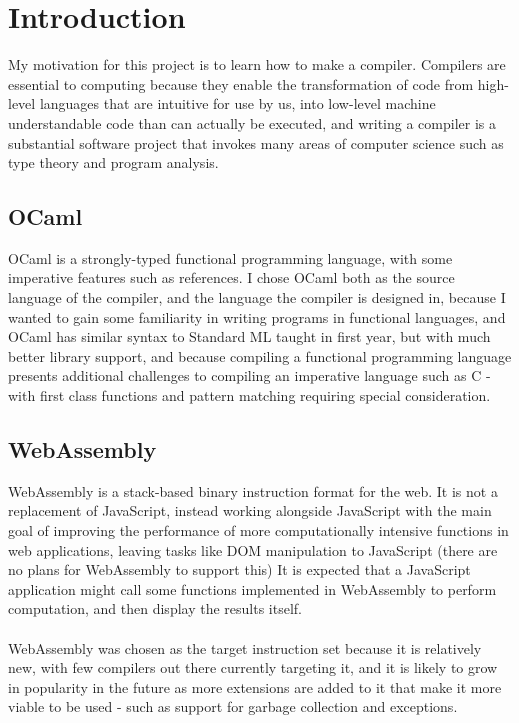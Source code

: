 \chapter{Introduction}

My motivation for this project is to learn how to make a compiler. Compilers are essential to computing because they enable the transformation of code from high-level languages that are intuitive for use by us, into low-level machine understandable code than can actually be executed, and writing a compiler is a substantial software project that invokes many areas of computer science such as type theory and program analysis.


\section{OCaml}
OCaml\cite{OCaml} is a strongly-typed functional programming language, with some imperative features such as references. I chose OCaml both as the source language of the compiler, and the language the compiler is designed in, because I wanted to gain some familiarity in writing programs in functional languages, and OCaml has similar syntax to Standard ML taught in first year, but with much better library support, and because compiling a functional programming language presents additional challenges to compiling an imperative language such as C - with first class functions and pattern matching requiring special consideration.

\section{WebAssembly}
WebAssembly\cite{webassembly} is a stack-based binary instruction format for the web. It is not a replacement of JavaScript, instead working alongside JavaScript with the main goal of improving the performance of  more computationally intensive functions in web applications, leaving tasks like DOM manipulation to JavaScript (there are no plans for WebAssembly to support this) It  is  expected  that  a  JavaScript  application might  call  some  functions  implemented  in  WebAssembly  to  perform  computation,  and then display the results itself.
\\\\
WebAssembly was chosen as the target instruction set because it is relatively new, with few compilers out there currently targeting it, and it is likely to grow in popularity in the future as more extensions are added to it that make it more viable to be used - such as support for garbage collection and exceptions.

